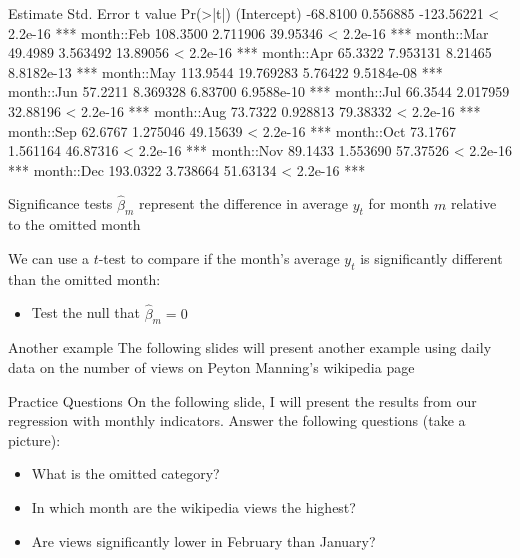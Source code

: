 \documentclass[aspectratio=169,t,11pt,table]{beamer}
\begin{document}
\begin{frame}[fragile]
  \begin{codeblock}
            Estimate Std. Error    t value   Pr(>|t|)    
(Intercept) -68.8100   0.556885 -123.56221  < 2.2e-16 ***
month::Feb  108.3500   2.711906   39.95346  < 2.2e-16 ***
month::Mar   49.4989   3.563492   13.89056  < 2.2e-16 ***
month::Apr   65.3322   7.953131    8.21465 8.8182e-13 ***
month::May  113.9544  19.769283    5.76422 9.5184e-08 ***
month::Jun   57.2211   8.369328    6.83700 6.9588e-10 ***
month::Jul   66.3544   2.017959   32.88196  < 2.2e-16 ***
month::Aug   73.7322   0.928813   79.38332  < 2.2e-16 ***
month::Sep   62.6767   1.275046   49.15639  < 2.2e-16 ***
month::Oct   73.1767   1.561164   46.87316  < 2.2e-16 ***
month::Nov   89.1433   1.553690   57.37526  < 2.2e-16 ***
month::Dec  193.0322   3.738664   51.63134  < 2.2e-16 ***
  \end{codeblock}
\end{frame}


\begin{frame}{Significance tests}
  $\hat{\beta}_m$ represent the difference in average $y_t$ for month $m$ relative to the omitted month 

  \bigskip
  We can use a $t$-test to compare if the month's average $y_t$ is significantly different than the omitted month:
  \begin{itemize}
    \item Test the null that $\hat{\beta}_m = 0$
  \end{itemize}
\end{frame}

\begin{frame}{Another example}
  The following slides will present another example using daily data on the number of views on Peyton Manning's wikipedia page
\end{frame}


\begin{frame}{Practice Questions}
  On the following slide, I will present the results from our regression with monthly indicators. Answer the following questions (take a picture):
  \begin{itemize}
    \item What is the omitted category?
    
    \item In which month are the wikipedia views the highest?
    
    \item Are views significantly lower in February than January?
  \end{itemize}
\end{frame}
\end{document}
